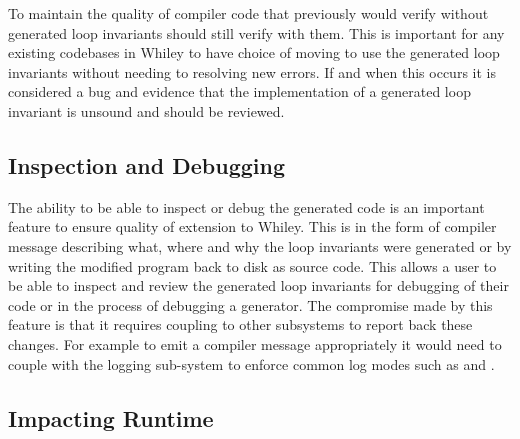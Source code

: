 To maintain the quality of compiler code that previously would verify without 
generated loop invariants should still verify with them.
This is important for any existing codebases in Whiley to have choice of
moving to use the generated loop invariants without needing to resolving new
errors.
If and when this occurs it is considered a bug and evidence that the implementation 
of a generated loop invariant is unsound and should be reviewed.

\subsection{Inspection and Debugging}

The ability to be able to inspect or debug the generated code is an important feature to
ensure quality of extension to Whiley.
This is in the form of compiler message describing what, where and why
the loop invariants were generated or by writing the modified program back
to disk as source code.
This allows a user to be able to inspect and review the generated loop invariants for
debugging of their code or in the process of debugging a generator.
The compromise made by this feature is that it requires coupling to other
subsystems to report back these changes.
For example to emit a compiler message appropriately it would need
to couple with the logging sub-system to enforce common log modes such as
 and .

\subsection{Impacting Runtime}\label{s:design-create-var}

